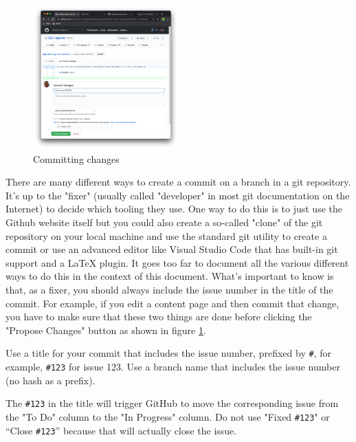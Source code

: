 %
%
\begin{figure}
    \vspace{-12pt}
    \begin{center}
        \includegraphics[width=0.50\textwidth]{../images/ekgmm-process-commit-changes.png}
    \end{center}
    \caption{Committing changes}
    \label{fig:ekgmm-process-commit-changes}
\end{figure}

There are many different ways to create a commit on a branch in a 
git repository. It’s up to the "fixer" (usually called "developer"
in most git documentation on the Internet) to decide which
tooling they use.
One way to do this is to just use the Github website itself but you
could also create a so-called "clone" of the git repository on your 
local machine and use the standard git utility to create a commit or 
use an advanced editor like Visual Studio Code that has built-in 
git support and a LaTeX plugin. 
It goes too far to document all the various different ways to do this 
in the context of this document.
What’s important to know is that, as a fixer, you should always include
the issue number in the title of the commit. 
For example, if you edit a content page and then commit that change, 
you have to make sure that these two things are done before clicking 
the "Propose Changes" button as shown in figure \ref{fig:ekgmm-process-commit-changes}.

Use a title for your commit that includes the issue number, 
prefixed by \texttt{\#}, for example, \texttt{\#123} for issue 123.
Use a branch name that includes the issue number (no hash as a prefix).

The \texttt{\#123} in the title will trigger GitHub to move the
corresponding issue from the "To Do" column to the "In Progress" column.
Do not use "Fixed \texttt{\#123}" or “Close \texttt{\#123}” because that 
will actually close the issue.

